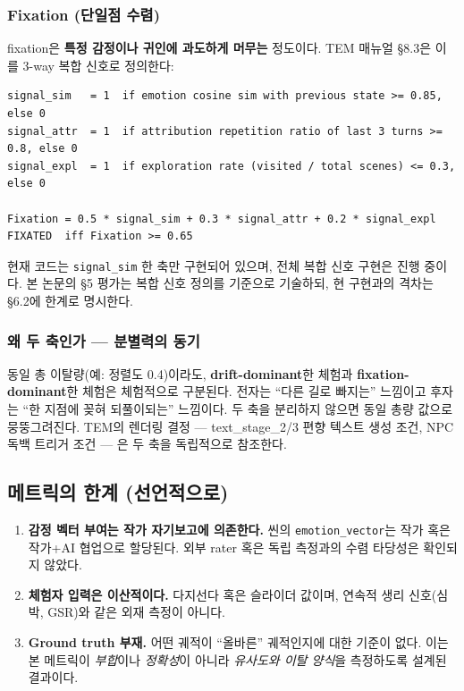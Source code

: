 \documentclass[11pt, a4paper]{article}
\begin{document}
\subsubsection{Fixation (단일점 수렴)}
fixation은 \textbf{특정 감정이나 귀인에 과도하게 머무는} 정도이다. TEM 매뉴얼 §8.3은 이를 3-way 복합 신호로 정의한다:
\begin{lstlisting}
signal_sim   = 1  if emotion cosine sim with previous state >= 0.85, else 0
signal_attr  = 1  if attribution repetition ratio of last 3 turns >= 0.8, else 0
signal_expl  = 1  if exploration rate (visited / total scenes) <= 0.3, else 0

Fixation = 0.5 * signal_sim + 0.3 * signal_attr + 0.2 * signal_expl
FIXATED  iff Fixation >= 0.65
\end{lstlisting}
현재 코드는 \texttt{signal\_sim} 한 축만 구현되어 있으며, 전체 복합 신호 구현은 진행 중이다. 본 논문의 \S5 평가는 복합 신호 정의를 기준으로 기술하되, 현 구현과의 격차는 \S6.2에 한계로 명시한다.

\subsubsection{왜 두 축인가 --- 분별력의 동기}
동일 총 이탈량(예: 정렬도 0.4)이라도, \textbf{drift-dominant}한 체험과 \textbf{fixation-dominant}한 체험은 체험적으로 구분된다. 전자는 ``다른 길로 빠지는'' 느낌이고 후자는 ``한 지점에 꽂혀 되풀이되는'' 느낌이다. 두 축을 분리하지 않으면 동일 총량 값으로 뭉뚱그려진다. TEM의 렌더링 결정 --- text\_stage\_2/3 편향 텍스트 생성 조건, NPC 독백 트리거 조건 --- 은 두 축을 독립적으로 참조한다.

\subsection{메트릭의 한계 (선언적으로)}
\begin{enumerate}
  \item \textbf{감정 벡터 부여는 작가 자기보고에 의존한다.} 씬의 \texttt{emotion\_vector}는 작가 혹은 작가+AI 협업으로 할당된다. 외부 rater 혹은 독립 측정과의 수렴 타당성은 확인되지 않았다.
  \item \textbf{체험자 입력은 이산적이다.} 다지선다 혹은 슬라이더 값이며, 연속적 생리 신호(심박, GSR)와 같은 외재 측정이 아니다.
  \item \textbf{Ground truth 부재.} 어떤 궤적이 ``올바른'' 궤적인지에 대한 기준이 없다. 이는 본 메트릭이 \textit{부합}이나 \textit{정확성}이 아니라 \textit{유사도와 이탈 양식}을 측정하도록 설계된 결과이다.
\end{enumerate}
\end{document}
